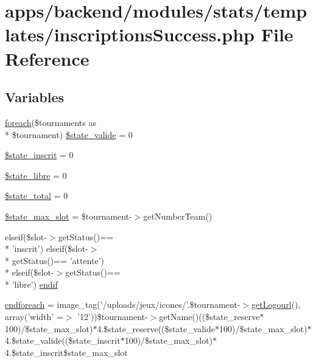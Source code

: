 \hypertarget{inscriptions_success_8php}{\section{apps/backend/modules/stats/templates/inscriptions\-Success.php File Reference}
\label{inscriptions_success_8php}
}
\subsection*{Variables}
\begin{DoxyCompactItemize}
\item 
\hyperlink{presse_2modules_2news_2templates_2index_success_8php_abc56db52b2e9a59bcd5c9e45ac5cb332}{foreach}(\$tournaments as \\*
\$tournament) \hyperlink{inscriptions_success_8php_af3a474618823746201622a7739282918}{\$state\-\_\-valide} = 0
\item 
\hyperlink{inscriptions_success_8php_a60be82fa65f561e562585794494783c9}{\$state\-\_\-inscrit} = 0
\item 
\hyperlink{inscriptions_success_8php_ab312d14793b9c36c5991645be5bf68ad}{\$state\-\_\-libre} = 0
\item 
\hyperlink{inscriptions_success_8php_a344152e8335a2555919a4fdf6bfa34ca}{\$state\-\_\-total} = 0
\item 
\hyperlink{inscriptions_success_8php_a25a9c16257ded9c5abc5490291886b22}{\$state\-\_\-max\-\_\-slot} = \$tournament-\/$>$get\-Number\-Team()
\item 
elseif(\$slot-\/$>$get\-Status()== \\*
'inscrit') elseif(\$slot-\/$>$\\*
get\-Status()== 'attente') \\*
elseif(\$slot-\/$>$get\-Status()== \\*
'libre') \hyperlink{inscriptions_success_8php_aad37429372b77b04e6ea45a3acb9bee3}{endif}
\item 
\hyperlink{inscriptions_success_8php_a672d9707ef91db026c210f98cc601123}{endforeach} = image\-\_\-tag('/uploads/jeux/icones/'.\$tournament-\/$>$\hyperlink{backend_2modules_2tournament_2templates_2index_success_8php_a35941bec2f3cf7beef9b8010a1342325}{get\-Logourl}(), array('width' =$>$ '12'))\$tournament-\/$>$get\-Name()((\$state\-\_\-reserve$\ast$100)/\$state\-\_\-max\-\_\-slot)$\ast$4.\$state\-\_\-reserve((\$state\-\_\-valide$\ast$100)/\$state\-\_\-max\-\_\-slot)$\ast$4.\$state\-\_\-valide((\$state\-\_\-inscrit$\ast$100)/\$state\-\_\-max\-\_\-slot)$\ast$4.\$state\-\_\-inscrit\$state\-\_\-max\-\_\-slot

\end{DoxyCompactItemize}
